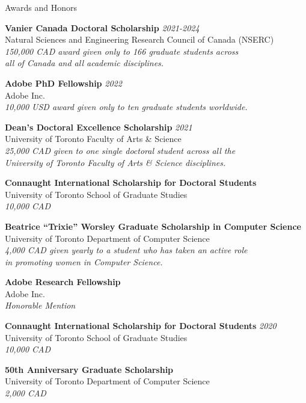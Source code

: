 \documentclass{resume} %
\begin{document}
\begin{rSection}{Awards and Honors}



{\bf Vanier Canada Doctoral Scholarship} \hfill {\em 2021-2024} \\ 
Natural Sciences and Engineering Research Council of Canada (NSERC)\\
{\it 150,000 CAD award given only to 166 graduate students across}\\
{\it all of Canada and all academic disciplines.}

{\bf Adobe PhD Fellowship} \hfill {\em 2022} \\ 
Adobe Inc.\\
{\it 10,000 USD award given only to ten graduate students worldwide.}

{\bf Dean's Doctoral Excellence Scholarship} \hfill {\em 2021} \\ 
University of Toronto Faculty of Arts \& Science\\
{\it 25,000 CAD given to one single doctoral student across all the}\\ 
{\it University of Toronto Faculty of Arts \& Science disciplines.}

{\bf Connaught International Scholarship for Doctoral Students}\\ 
University of Toronto School of Graduate Studies\\
{\it 10,000 CAD}

{\bf Beatrice ``Trixie'' Worsley Graduate Scholarship in Computer Science}\\ 
University of Toronto Department of Computer Science\\
{\it 4,000 CAD given yearly to a student who has taken an active role}\\
{\it in promoting women in Computer Science.}

{\bf Adobe Research Fellowship}  \\ 
Adobe Inc.\\
{\it Honorable Mention}

{\bf Connaught International Scholarship for Doctoral Students} \hfill {\em 2020} \\ 
University of Toronto School of Graduate Studies\\
{\it 10,000 CAD}

{\bf 50th Anniversary Graduate Scholarship}  \\ 
University of Toronto Department of Computer Science\\
{\it 2,000 CAD}


\end{rSection}
\end{document}
